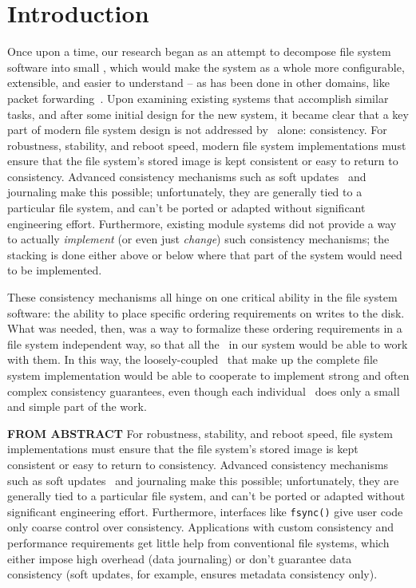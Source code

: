 \section {Introduction}
\label{sec:intro}

Once upon a time, our research began as an attempt to decompose file system
software into small \modules, which would make the system as a whole more
configurable, extensible, and easier to understand -- as has been done in other
domains, like packet forwarding~\cite{kohler00click}. Upon examining existing
systems that accomplish similar tasks, and after some initial design for the new
system, it became clear that a key part of modern file system design is not
addressed by \modules\ alone: consistency. For robustness, stability, and reboot
speed, modern file system implementations must ensure that the file system's
stored image is kept consistent or easy to return to consistency. Advanced
consistency mechanisms such as soft updates~\cite{ganger00soft} and journaling
make this possible; unfortunately, they are generally tied to a particular file
system, and can't be ported or adapted without significant engineering effort.
Furthermore, existing module systems did not provide a way to actually
\emph{implement} (or even just \emph{change}) such consistency mechanisms; the
stacking is done either above or below where that part of the system would need
to be implemented.

These consistency mechanisms all hinge on one critical ability in the file
system software: the ability to place specific ordering requirements on writes
to the disk. What was needed, then, was a way to formalize these ordering
requirements in a file system independent way, so that all the \modules\ in our
system would be able to work with them. In this way, the loosely-coupled
\modules\ that make up the complete file system implementation would be able to
cooperate to implement strong and often complex consistency guarantees, even
though each individual \module\ does only a small and simple part of the work.

\textbf{FROM ABSTRACT}
For robustness, stability, and reboot speed, file system implementations must
ensure that the file system's stored image is kept consistent or easy to return
to consistency. Advanced consistency mechanisms such as soft
updates~\cite{ganger00soft} and journaling make this possible; unfortunately,
they are generally tied to a particular file system, and can't be ported or
adapted without significant engineering effort. Furthermore, interfaces like
\texttt{fsync()} give user code only coarse control over consistency.
Applications with custom consistency and performance requirements get little
help from conventional file systems, which either impose high overhead (data
journaling) or don't guarantee data consistency (soft updates, for example,
ensures metadata consistency only).

